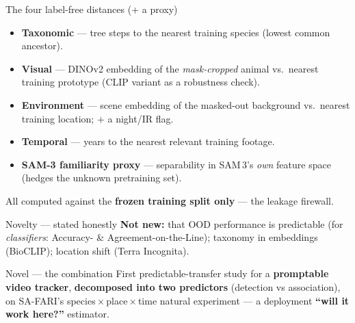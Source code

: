 \documentclass[aspectratio=169,11pt]{beamer}
\begin{document}
\begin{frame}{The four label-free distances (+ a proxy)}
  \begin{itemize}
    \item \textbf{Taxonomic} --- tree steps to the nearest training species (lowest common ancestor).
    \item \textbf{Visual} --- DINOv2 embedding of the \emph{mask-cropped} animal vs.\ nearest training
          prototype (CLIP variant as a robustness check).
    \item \textbf{Environment} --- scene embedding of the masked-out background vs.\ nearest training
          location; $+$ a night/IR flag.
    \item \textbf{Temporal} --- years to the nearest relevant training footage.
    \item \textbf{SAM-3 familiarity proxy} --- separability in SAM\,3's \emph{own} feature space (hedges
          the unknown pretraining set).
  \end{itemize}
  \vspace{0.2em}
  \centering\footnotesize All computed against the \textbf{frozen training split only} --- the leakage
  firewall.
\end{frame}

\begin{frame}{Novelty --- stated honestly}
  \textbf{Not new:} that OOD performance is predictable (for \emph{classifiers}: Accuracy- \&
  Agreement-on-the-Line); taxonomy in embeddings (BioCLIP); location shift (Terra Incognita).
  \vfill
  \begin{block}{Novel --- the combination}
    First predictable-transfer study for a \textbf{promptable video tracker}, \textbf{decomposed into
    two predictors} (detection vs association), on SA-FARI's species\,$\times$\,place\,$\times$\,time
    natural experiment --- a deployment \textbf{``will it work here?''} estimator.
  \end{block}
\end{frame}
\end{document}

